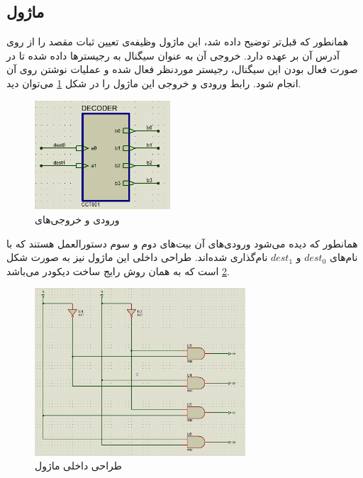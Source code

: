 \documentclass[12pt,onecolumn,a4paper,fleqn]{article}
\begin{document}
	\subsection{ماژول }
	همانطور که قبل‌تر توضیح داده شد، این ماژول وظیفه‌ی تعیین ثبات مقصد را از روی آدرس آن بر عهده دارد. خروجی آن به عنوان سیگنال  به رجیسترها داده شده تا در صورت فعال بودن این سیگنال، رجیستر موردنظر فعال شده و عملیات نوشتن روی آن انجام شود. رابط ورودی و خروجی این ماژول را در شکل \ref{fig:decoder} می‌توان دید.
	\begin{figure}[H]
		\centering
		\includegraphics[width=0.45\textwidth]{source/decoder.png}
		\caption{ورودی و خروجی‌های }
		\label{fig:decoder}
	\end{figure}
	همانطور که دیده می‌شود ورودی‌های آن بیت‌های دوم و سوم دستورالعمل هستند که با نام‌های $dest_0$ و $dest_1$ نام‌گذاری شده‌اند. طراحی داخلی این ماژول نیز به صورت شکل \ref{fig:decoder-in} است که به همان روش رایج ساخت دیکودر می‌باشد.
	\begin{figure}[H]
		\centering
		\includegraphics[width=0.7\textwidth]{source/decoder-in.png}
		\caption{طراحی داخلی ماژول }
		\label{fig:decoder-in}
	\end{figure}
\end{document}
